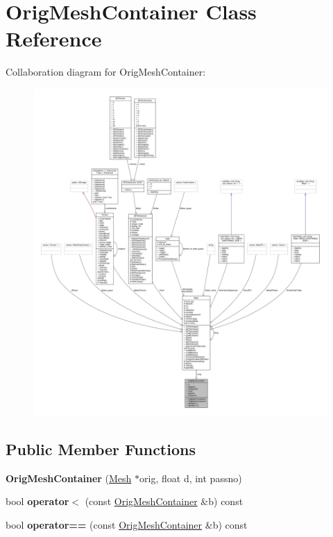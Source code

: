 \hypertarget{classOrigMeshContainer}{}\section{Orig\+Mesh\+Container Class Reference}
\label{classOrigMeshContainer}


Collaboration diagram for Orig\+Mesh\+Container\+:
\nopagebreak
\begin{figure}[H]
\begin{center}
\leavevmode
\includegraphics[width=350pt]{d1/da5/classOrigMeshContainer__coll__graph}
\end{center}
\end{figure}
\subsection*{Public Member Functions}
\begin{DoxyCompactItemize}
\item 
{\bfseries Orig\+Mesh\+Container} (\hyperlink{classMesh}{Mesh} $\ast$orig, float d, int passno)\hypertarget{classOrigMeshContainer_aa24c1baac622252525c4580ae95944a9}{}\label{classOrigMeshContainer_aa24c1baac622252525c4580ae95944a9}

\item 
bool {\bfseries operator$<$} (const \hyperlink{classOrigMeshContainer}{Orig\+Mesh\+Container} \&b) const \hypertarget{classOrigMeshContainer_ab412bfbdce22aea97faf5bbad6f27e14}{}\label{classOrigMeshContainer_ab412bfbdce22aea97faf5bbad6f27e14}

\item 
bool {\bfseries operator==} (const \hyperlink{classOrigMeshContainer}{Orig\+Mesh\+Container} \&b) const \hypertarget{classOrigMeshContainer_a37d620a6690c74bc8ee4906e9b03469d}{}\label{classOrigMeshContainer_a37d620a6690c74bc8ee4906e9b03469d}

\end{DoxyCompactItemize}

